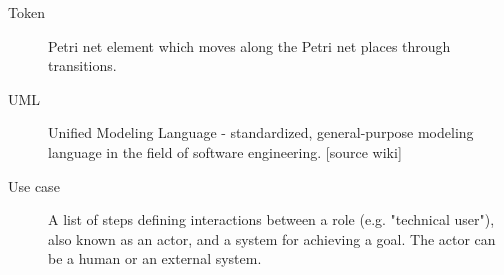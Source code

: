 \begin{description}
\item [Token] Petri net element which moves along the Petri net places through transitions.

\item [UML] Unified Modeling Language - standardized, general-purpose modeling language in the field of software engineering. [source wiki]

\item [Use case] A list of steps defining interactions between a role (e.g. "technical user"), also known as an actor, and a system for achieving a goal. The actor can be a human or an external system.





 \end{description}
